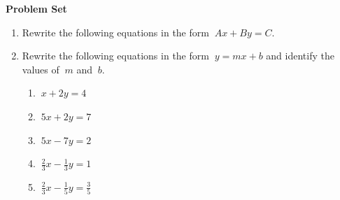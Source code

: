 \textbf{Problem Set}

\begin{enumerate}[label = \Alph*. ]
\item 
Rewrite the following  equations in the form  $\ {Ax  +By=C}$. 

\begin{enumerate}[label = \arabic*. ]
\end{enumerate}   


\item 
Rewrite the following equations in the form $\ {y  =  mx  +  b }$ and identify the values of  $\ { m}$   and  $\ {b }$.
\begin{enumerate}[label = \arabic*. ]

\item \hspce $\ {x  + 2y  = 4}$ 
\  

\item \hspce $\ {5x  + 2y=7}$ 
\  

\item \hspce $\ {5x-7y  = 2}$ 
\  

\item \hspce $\ { \displaystyle  \frac{2}{3}x- \displaystyle  \frac{1}{3}y = 1}$ 
\  

\item \hspce $\ {\displaystyle  \frac{2}{3}x -\displaystyle  \frac{1}{5}y=\displaystyle  \frac{3}{5}  }$

\end{enumerate}  

\end{enumerate} 


